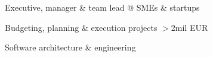 \begin{itemize}[leftmargin=0.0in]
    \small{\item{
          {Executive, manager \& team lead @ SMEs \& startups} \\
      }}\vspace{-4pt}
      \small{\item{
        {Budgeting, planning \& execution projects $>$2mil EUR} \\
    }}\vspace{-4pt}
    \small{\item{
          {Software architecture \& engineering} \\
      }}
    \end{itemize}